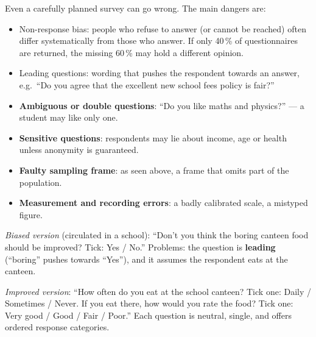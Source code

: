 \documentclass[11pt]{article}
\newcommand{\cle}[1]{{\popxbold\color{popdark}#1}}
\newcounter{popsec}
\newcounter{popsub}
\newcommand{\courssub}[1]{%
  \stepcounter{popsub}%
  \par\vspace{9pt}\noindent{\popxbold\fontsize{11.5}{13}\selectfont\color{popink}{\color{poporange}\thepopsec.\thepopsub}\hspace{6pt}#1}\par\nopagebreak\vspace{4pt}
}
\begin{document}
\courssub{Sources of Error and Bias}

Even a carefully planned survey can go wrong. The main dangers are:

\begin{itemize}
\item \cle{Non-response bias}: people who refuse to answer (or cannot be reached) often differ systematically from those who answer. If only 40\,\% of questionnaires are returned, the missing 60\,\% may hold a different opinion.
\item \cle{Leading questions}: wording that pushes the respondent towards an answer, e.g.\ ``Do you agree that the excellent new school fees policy is fair?''
\item \textbf{Ambiguous or double questions}: ``Do you like maths and physics?'' — a student may like only one.
\item \textbf{Sensitive questions}: respondents may lie about income, age or health unless anonymity is guaranteed.
\item \textbf{Faulty sampling frame}: as seen above, a frame that omits part of the population.
\item \textbf{Measurement and recording errors}: a badly calibrated scale, a mistyped figure.
\end{itemize}

\begin{exemplebox}
\emph{Biased version} (circulated in a school): ``Don't you think the boring canteen food should be improved? Tick: Yes / No.'' Problems: the question is \textbf{leading} (``boring'' pushes towards ``Yes''), and it assumes the respondent eats at the canteen.

\emph{Improved version}: ``How often do you eat at the school canteen? Tick one: Daily / Sometimes / Never. If you eat there, how would you rate the food? Tick one: Very good / Good / Fair / Poor.'' Each question is neutral, single, and offers ordered response categories.
\end{exemplebox}
\end{document}
